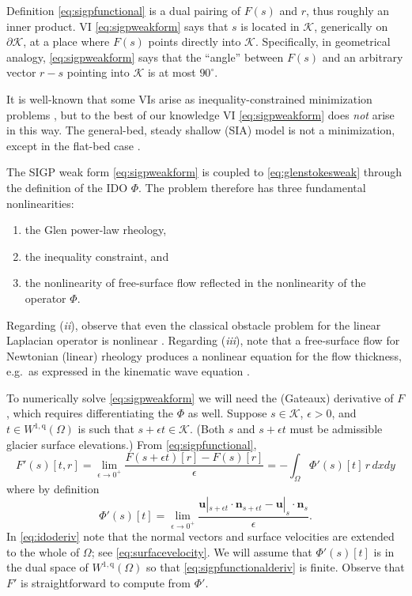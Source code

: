 \documentclass[letterpaper,final,12pt,reqno]{amsart}
\theoremstyle{claim}
\newcommand{\eps}{\epsilon}
\newcommand{\bn}{\mathbf{n}}
\newcommand{\bu}{\mathbf{u}}
\newcommand{\qq}{{\text{q}}}
\newcommand{\bus}{\bu|_s}
\numberwithin{equation}{section}
\numberwithin{figure}{section}
\numberwithin{table}{section}
\numberwithin{theorem}{section}
\begin{document}
Definition \eqref{eq:sigpfunctional} is a dual pairing of $F(s)$ and $r$, thus roughly an inner product.  VI \eqref{eq:sigpweakform} says that $s$ is located in $\mathcal{K}$, generically on $\partial\mathcal{K}$, at a place where $F(s)$ points directly into $\mathcal{K}$.  Specifically, in geometrical analogy, \eqref{eq:sigpweakform} says that the ``angle'' between $F(s)$ and an arbitrary vector $r-s$ pointing into $\mathcal{K}$ is at most $90^\circ$.

It is well-known that some VIs arise as inequality-constrained minimization problems \cite{GraeserKornhuber2009,KinderlehrerStampacchia1980}, but to the best of our knowledge VI \eqref{eq:sigpweakform} does \emph{not} arise in this way.  The general-bed, steady shallow (SIA) model is not a minimization, except in the flat-bed case \cite{JouvetBueler2012}.

The SIGP weak form \eqref{eq:sigpweakform} is coupled to \eqref{eq:glenstokesweak} through the definition of the IDO $\Phi$.  The problem therefore has three fundamental nonlinearities:
\renewcommand{\labelenumi}{(\emph{\roman{enumi}})}
\begin{enumerate}
\item the Glen power-law rheology,
\item the inequality constraint, and
\item the nonlinearity of free-surface flow reflected in the nonlinearity of the operator $\Phi$.
\end{enumerate}
Regarding (\emph{ii}), observe that even the classical obstacle problem for the linear Laplacian operator is nonlinear \cite{KinderlehrerStampacchia1980}.  Regarding (\emph{iii}), note that a free-surface flow for Newtonian (linear) rheology produces a nonlinear equation for the flow thickness, e.g.~as expressed in the kinematic wave equation \cite{Ockendonetal2003}.

To numerically solve \eqref{eq:sigpweakform} we will need the (Gateaux) derivative of $F$, which requires differentiating the $\Phi$ as well.  Suppose $s\in \mathcal{K}$, $\eps>0$, and $t \in W^{1,\qq}(\Omega)$ is such that $s+\eps t \in \mathcal{K}$.  (Both $s$ and $s+\eps t$ must be admissible glacier surface elevations.)  From \eqref{eq:sigpfunctional},
\begin{equation}
F'(s)[t,r] = \lim_{\eps\to 0^+} \frac{F(s+\eps t)[r] - F(s)[r]}{\eps} = - \int_\Omega \Phi'(s)[t]\, r \,dx dy \label{eq:sigpfunctionalderiv}
\end{equation}
where by definition
\begin{equation}
\Phi'(s)[t] = \lim_{\eps\to 0^+} \frac{\bu|_{s+\eps t} \cdot \bn_{s+\eps t} - \bus \cdot \bn_s}{\eps}. \label{eq:idoderiv}
\end{equation}
In \eqref{eq:idoderiv} note that the normal vectors and surface velocities are extended to the whole of $\Omega$; see \eqref{eq:surfacevelocity}.  We will assume that $\Phi'(s)[t]$ is in the dual space of $W^{1,\qq}(\Omega)$ so that \eqref{eq:sigpfunctionalderiv} is finite.  Observe that $F'$ is straightforward to compute from $\Phi'$.
\end{document}
